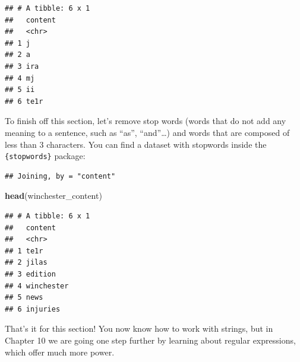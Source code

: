 \documentclass[]{gitbook}
\newenvironment{Shaded}{\begin{snugshade}}{\end{snugshade}}
\newcommand{\DecValTok}[1]{\textcolor[rgb]{0.00,0.00,0.81}{#1}}
\newcommand{\KeywordTok}[1]{\textcolor[rgb]{0.13,0.29,0.53}{\textbf{#1}}}
\newcommand{\NormalTok}[1]{#1}
\newcommand{\OperatorTok}[1]{\textcolor[rgb]{0.81,0.36,0.00}{\textbf{#1}}}
\newcommand{\StringTok}[1]{\textcolor[rgb]{0.31,0.60,0.02}{#1}}
\begin{document}
\begin{verbatim}
## # A tibble: 6 x 1
##   content
##   <chr>  
## 1 j      
## 2 a      
## 3 ira    
## 4 mj     
## 5 ii     
## 6 te1r
\end{verbatim}

To finish off this section, let's remove stop words (words that do not add any meaning to a sentence,
such as ``as'', ``and''\ldots) and words that are composed of less than 3 characters. You can find a dataset
with stopwords inside the \texttt{\{stopwords\}} package:

\begin{Shaded}
\end{Shaded}

\begin{verbatim}
## Joining, by = "content"
\end{verbatim}

\begin{Shaded}
\begin{Highlighting}[]
\KeywordTok{head}\NormalTok{(winchester_content)}
\end{Highlighting}
\end{Shaded}

\begin{verbatim}
## # A tibble: 6 x 1
##   content   
##   <chr>     
## 1 te1r      
## 2 jilas     
## 3 edition   
## 4 winchester
## 5 news      
## 6 injuries
\end{verbatim}

That's it for this section! You now know how to work with strings, but in Chapter 10 we are going
one step further by learning about regular expressions, which offer much more power.
\end{document}
